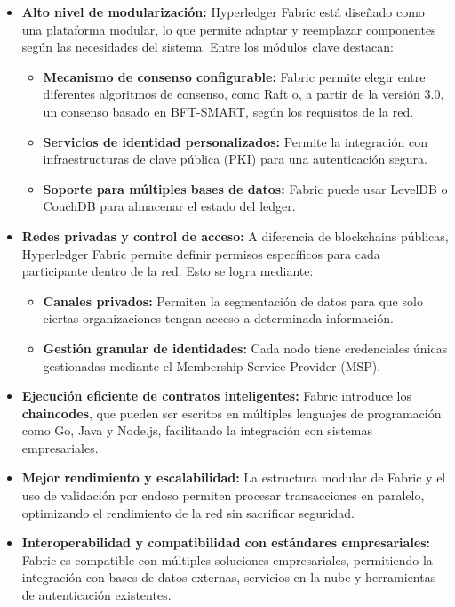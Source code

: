 \begin{itemize}
    \item \textbf{Alto nivel de modularización:} Hyperledger Fabric está diseñado como una plataforma modular, lo que permite adaptar y reemplazar componentes según las necesidades del sistema. Entre los módulos clave destacan:
    \begin{itemize}
        \item \textbf{Mecanismo de consenso configurable:} Fabric permite elegir entre diferentes algoritmos de consenso, como Raft o, a partir de la versión 3.0, un consenso basado en BFT-SMART, según los requisitos de la red.
        \item \textbf{Servicios de identidad personalizados:} Permite la integración con infraestructuras de clave pública (PKI) para una autenticación segura.
        \item \textbf{Soporte para múltiples bases de datos:} Fabric puede usar LevelDB o CouchDB para almacenar el estado del ledger.
    \end{itemize}
    
    \item \textbf{Redes privadas y control de acceso:} A diferencia de blockchains públicas, Hyperledger Fabric permite definir permisos específicos para cada participante dentro de la red. Esto se logra mediante:
    \begin{itemize}
        \item \textbf{Canales privados:} Permiten la segmentación de datos para que solo ciertas organizaciones tengan acceso a determinada información.
        \item \textbf{Gestión granular de identidades:} Cada nodo tiene credenciales únicas gestionadas mediante el Membership Service Provider (MSP).
    \end{itemize}
    
    \item \textbf{Ejecución eficiente de contratos inteligentes:} Fabric introduce los \textbf{chaincodes}, que pueden ser escritos en múltiples lenguajes de programación como Go, Java y Node.js, facilitando la integración con sistemas empresariales.
    
    \item \textbf{Mejor rendimiento y escalabilidad:} La estructura modular de Fabric y el uso de validación por endoso permiten procesar transacciones en paralelo, optimizando el rendimiento de la red sin sacrificar seguridad.
    
    \item \textbf{Interoperabilidad y compatibilidad con estándares empresariales:} Fabric es compatible con múltiples soluciones empresariales, permitiendo la integración con bases de datos externas, servicios en la nube y herramientas de autenticación existentes.
    
\end{itemize}

